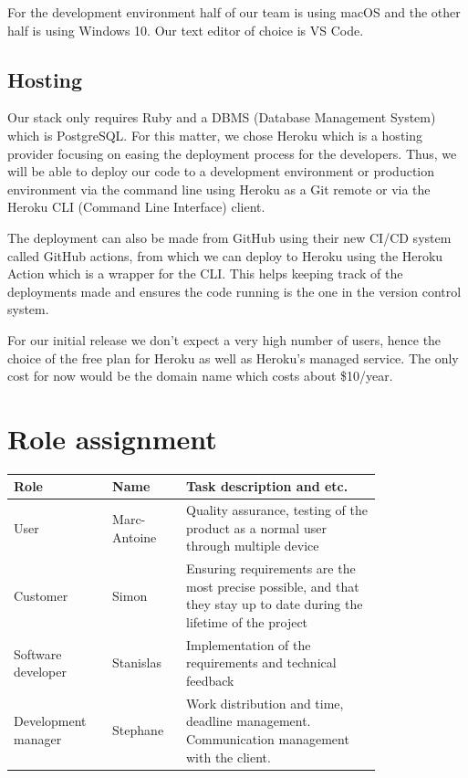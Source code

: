 \documentclass[conference]{IEEEtran}
\begin{document}
For the development environment half of our team is using macOS and the other half is using Windows 10.
Our text editor of choice is VS Code.

\subsection{Hosting}

Our stack only requires Ruby and a DBMS (Database Management System) which is PostgreSQL.
For this matter, we chose Heroku which is a hosting provider focusing on easing the deployment process for the developers.
Thus, we will be able to deploy our code to a development environment or production environment via the command line using Heroku as a Git remote or via the Heroku CLI (Command Line Interface) client.

The deployment can also be made from GitHub using their new CI/CD system called GitHub actions, from which we can deploy to Heroku using the Heroku Action which is a wrapper for the CLI.
This helps keeping track of the deployments made and ensures the code running is the one in the version control system.

For our initial release we don't expect a very high number of users, hence the choice of the free plan for Heroku as well as Heroku's managed service.
The only cost for now would be the domain name which costs about \$10/year.


\section{Role assignment}

\begin{tabular}{ |p{0.2\linewidth}|p{0.15\linewidth}|p{0.45\linewidth}| }
\hline
Role & Name & Task description and etc. \\
\hline
User & Marc-Antoine & Quality assurance, testing of the product as a normal user through multiple device \\
\hline
Customer & Simon & Ensuring requirements are the most precise possible, and that they stay up to date during the lifetime of the project \\
\hline
Software developer & Stanislas & Implementation of the requirements and technical feedback \\
\hline
Development manager & Stephane & Work distribution and time, deadline management. Communication management with the client. \\
\hline
\end{tabular}
\end{document}
